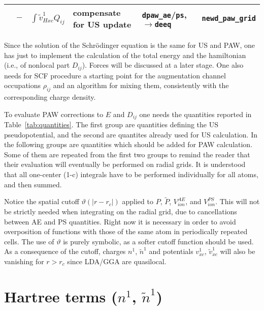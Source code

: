 \documentclass[a4paper,twocolumn,12pt]{article}
\newcommand{\var}[1]{{\tt #1}}
\renewcommand{\theta}{\vartheta}
\begin{document}
\begin{table*}
\begin{small}
\begin{tabular}{|c@{}c@{}l|p{4.5cm}|p{4.5cm}|p{4.0cm}|}
%
$ $ &$-$& $\int{\tilde{v}^1_{Hxc}Q_{ij}}$ & compensate for US update & \var{dpaw\_ae}/\var{ps}, $\rightarrow$\var{deeq} & \var{newd\_paw\_grid}\\
%
\hline
\end{tabular}
\end{small}
\caption{\label{tab:quantities}Quantities needed to perform PAW
calculation on the regular grid}
\end{table*}


Since the solution of the Schr\"odinger equation is the same for US
and PAW, one has just to implement the calculation of the total
energy and the hamiltonian (i.e., of nonlocal part $D_{ij}$).
Forces will be discussed at a later stage.  One also needs for SCF
procedure a starting point for the augmentation channel occupations
$\rho_{ij}$ and an algorithm for mixing them, consistently with the
corresponding charge density.

To evaluate PAW corrections to $E$ and $D_{ij}$ one needs the
quantities reported in Table~\ref{tab:quantities}.  The first group
are quantities defining the US pseudopotential, and the second are
quantites already used for US calculation.  In the following groups
are quantities which should be added for PAW calculation.  Some of
them are repeated from the first two groups to remind the reader that their
evaluation will eventually be performed on radial grids.  It is
understood that all one-center (1-c) integrals have to be performed
individually for all atoms, and then summed.

Notice the spatial cutoff $\theta(|r-r_c|)$ applied to $P$,
$\tilde{P}$, $V^{AE}_{ion}$, and $V^{PS}_{ion}$.  This will not be
strictly needed when integrating on the radial grid, due to
cancellations between AE and PS quantities.  Right now it is necessary
in order to avoid overposition of functions with those of the same
atom in periodically repeated cells.  The use of $\theta$ is purely
symbolic, as a softer cutoff function should be used.  As a
consequence of the cutoff, charges $n^1$, $\tilde{n}^1$ and potentials
$v^1_{xc}$, $\tilde{v}^1_{xc}$ will also be vanishing for $r>r_c$
since LDA/GGA are quasilocal.

\section*{Hartree terms ($n^1$, $\tilde{n}^1$)}
\end{document}
